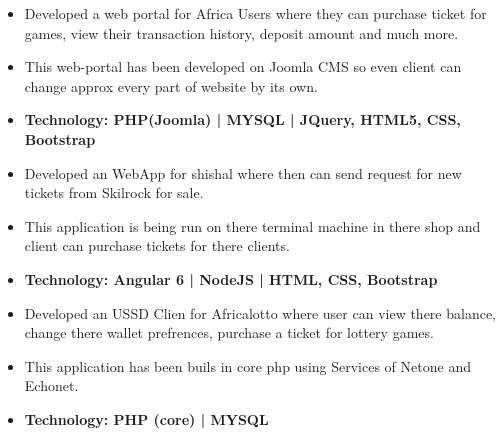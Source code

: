 \documentclass[10pt,a4paper,ragged2e]{altacv}
\begin{document}
\begin{itemize}
\item Developed a web portal for Africa Users where they can purchase ticket for games, view their transaction history, deposit amount and much more.
\item This web-portal has been developed on Joomla CMS so even client can change approx every part of website by its own.
\item\bf{Technology}{: PHP(Joomla) | MYSQL | JQuery, HTML5, CSS, Bootstrap }
\end{itemize}
\smallskip

\begin{itemize}
\item Developed an WebApp for shishal where then can send request for new tickets from Skilrock for sale.
\item This application is being run on there terminal machine in there shop and client can purchase tickets for there clients.
\item\bf{Technology}{: Angular 6 | NodeJS | HTML, CSS, Bootstrap }
\end{itemize}
\smallskip

\begin{itemize}
\item Developed an USSD Clien for Africalotto where user can view there balance, change there wallet prefrences, purchase a ticket for lottery games.
\item This application has been buils in core php using Services of Netone and Echonet.
\item\bf{Technology}{: PHP (core) | MYSQL }
\end{itemize}
\smallskip


\end{document}
